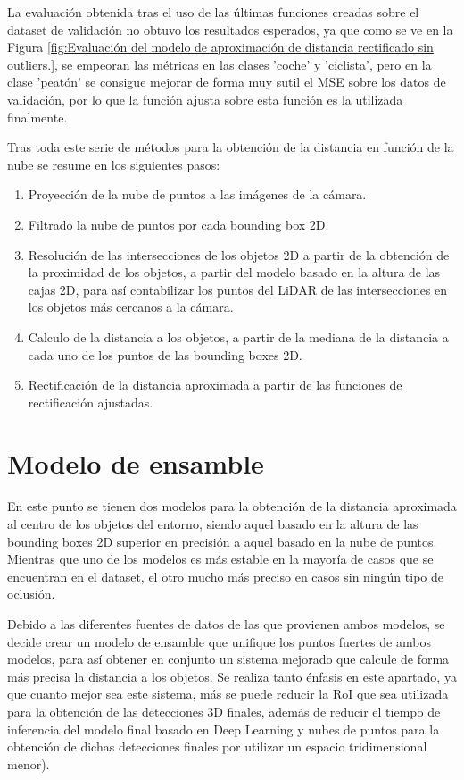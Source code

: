 La evaluación obtenida tras el uso de las últimas funciones creadas sobre el dataset de validación no obtuvo los resultados esperados, ya que como se ve en la Figura \ref{fig:Evaluación del modelo de aproximación de distancia rectificado sin outliers.}, se empeoran las métricas en las clases 'coche' y 'ciclista', pero en la clase 'peatón' se consigue mejorar de forma muy sutil el \ac{MSE} sobre los datos de validación, por lo que la función ajusta sobre esta función es la utilizada finalmente.

Tras toda este serie de métodos para la obtención de la distancia en función de la nube se resume en los siguientes pasos:
\begin{enumerate}
    \item Proyección de la nube de puntos a las imágenes de la cámara.
    \item Filtrado la nube de puntos por cada bounding box 2D.
    \item Resolución de las intersecciones de los objetos 2D a partir de la obtención de la proximidad de los objetos, a partir del modelo basado en la altura de las cajas 2D, para así contabilizar los puntos del \ac{LiDAR} de las intersecciones en los objetos más cercanos a la cámara.
    \item Calculo de la distancia a los objetos, a partir de la mediana de la distancia a cada uno de los puntos de las bounding boxes 2D.
    \item Rectificación de la distancia aproximada a partir de las funciones de rectificación ajustadas.
\end{enumerate}

\section{Modelo de ensamble}
\label{sec:Modelo de ensamble}

En este punto se tienen dos modelos para la obtención de la distancia aproximada al centro de los objetos del entorno, siendo aquel basado en la altura de las bounding boxes 2D superior en precisión a aquel basado en la nube de puntos. Mientras que uno de los modelos es más estable en la mayoría de casos que se encuentran en el dataset, el otro mucho más preciso en casos sin ningún tipo de oclusión.

Debido a las diferentes fuentes de datos de las que provienen ambos modelos, se decide crear un modelo de ensamble que unifique los puntos fuertes de ambos modelos, para así obtener en conjunto un sistema mejorado que calcule de forma más precisa la distancia a los objetos. Se realiza tanto énfasis en este apartado, ya que cuanto mejor sea este sistema, más se puede reducir la \ac{RoI} que sea utilizada para la obtención de las detecciones 3D finales, además de reducir el tiempo de inferencia del modelo final basado en Deep Learning y nubes de puntos para la obtención de dichas detecciones finales por utilizar un espacio tridimensional menor).


